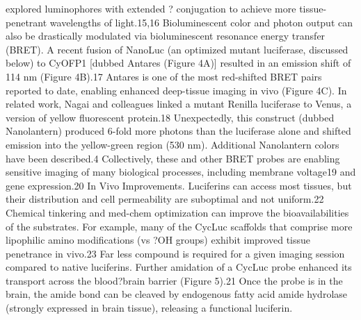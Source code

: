 explored luminophores with extended ? conjugation to achieve
more tissue-penetrant wavelengths of light.15,16
Bioluminescent color and photon output can also be
drastically modulated via bioluminescent resonance energy
transfer (BRET). A recent fusion of NanoLuc (an optimized
mutant luciferase, discussed below) to CyOFP1 [dubbed
Antares (Figure 4A)] resulted in an emission shift of 114 nm
(Figure 4B).17 Antares is one of the most red-shifted BRET
pairs reported to date, enabling enhanced deep-tissue imaging
in vivo (Figure 4C). In related work, Nagai and colleagues
linked a mutant Renilla luciferase to Venus, a version of yellow
fluorescent protein.18 Unexpectedly, this construct (dubbed
Nanolantern) produced 6-fold more photons than the
luciferase alone and shifted emission into the yellow-green
region (530 nm). Additional Nanolantern colors have been
described.4 Collectively, these and other BRET probes are
enabling sensitive imaging of many biological processes,
including membrane voltage19 and gene expression.20
In Vivo Improvements. Luciferins can access most tissues,
but their distribution and cell permeability are suboptimal and
not uniform.22 Chemical tinkering and med-chem optimization
can improve the bioavailabilities of the substrates. For example,
many of the CycLuc scaffolds that comprise more lipophilic
amino modifications (vs ?OH groups) exhibit improved tissue
penetrance in vivo.23 Far less compound is required for a given
imaging session compared to native luciferins. Further
amidation of a CycLuc probe enhanced its transport across
the blood?brain barrier (Figure 5).21 Once the probe is in the
brain, the amide bond can be cleaved by endogenous fatty acid
amide hydrolase (strongly expressed in brain tissue), releasing a
functional luciferin.
